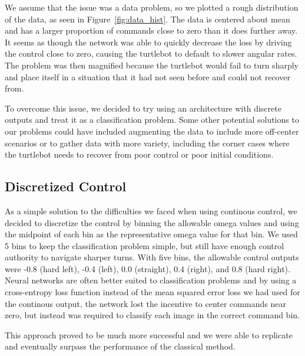 We assume that the issue was a data problem, so we plotted a rough distribution of the data, as seen in Figure~\ref{fig:data_hist}. The data is centered about mean and has a larger proportion of commands close to zero than it does further away. It seems as though the network was able to quickly decrease the loss by driving the control close to zero, causing the turtlebot to default to slower angular rates. The problem was then magnified because the turtlebot would fail to turn sharply and place itself in a situation that it had not seen before and could not recover from.

To overcome this issue, we decided to try using an architecture with discrete outputs and treat it as a classification problem. Some other potential solutions to our problems could have included augmenting the data to include more off-center scenarios or to gather data with more variety, including the corner cases where the turtlebot needs to recover from poor control or poor initial conditions.

\subsection{Discretized Control}
As a simple solution to the difficulties we faced when using continous control, we decided to discretize the control by binning the allowable omega values and using the midpoint of each bin as the representative omega value for that bin. We used 5 bins to keep the classification problem simple, but still have enough control authority to navigate sharper turns. With five bins, the allowable control outputs were -0.8 (hard left), -0.4 (left), 0.0 (straight), 0.4 (right), and 0.8 (hard right). Neural networks are often better suited to classification problems and by using a cross-entropy loss function instead of the mean squared error loss we had used for the continous output, the network lost the incentive to center commands near zero, but instead was required to classify each image in the correct command bin.

This approach proved to be much more successful and we were able to replicate and eventually surpass the performance of the classical method.
